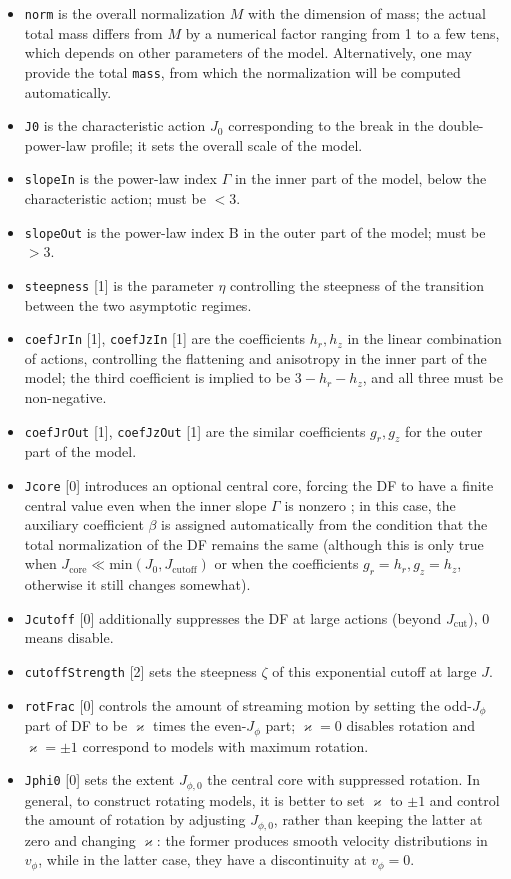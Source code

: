 \documentclass[12pt]{article}
\newcommand{\ppp}[1]{\textcolor{darkolive} {\texttt{#1}}}
\newcommand{\Beta}{\mathrm B}
\begin{document}
\begin{itemize}
\item \ppp{norm} is the overall normalization $M$ with the dimension of mass; the actual total mass differs from $M$ by a numerical factor ranging from 1 to a few tens, which depends on other parameters of the model. Alternatively, one may provide the total \ppp{mass}, from which the normalization will be computed automatically.
\item \ppp{J0} is the characteristic action $J_0$ corresponding to the break in the double-power-law profile; it sets the overall scale of the model.
\item \ppp{slopeIn} is the power-law index $\Gamma$ in the inner part of the model, below the characteristic action; must be $<3$.
\item \ppp{slopeOut} is the power-law index $\Beta$ in the outer part of the model; must be $>3$.
\item \ppp{steepness} [1] is the parameter $\eta$ controlling the steepness of the transition between the two asymptotic regimes.
\item \ppp{coefJrIn} [1], \ppp{coefJzIn} [1] are the coefficients $h_r, h_z$ in the linear combination of actions, controlling the flattening and anisotropy in the inner part of the model; the third coefficient is implied to be $3-h_r-h_z$, and all three must be non-negative.
\item \ppp{coefJrOut} [1], \ppp{coefJzOut} [1] are the similar coefficients $g_r, g_z$ for the outer part of the model.
\item \ppp{Jcore} [0] introduces an optional central core, forcing the DF to have a finite central value even when the inner slope $\Gamma$ is nonzero \cite{ColeBinney2017}; in this case, the auxiliary coefficient $\beta$ is assigned automatically from the condition that the total normalization of the DF remains the same (although this is only true when $J_\mathrm{core}\ll \mathrm{min}(J_0, J_\mathrm{cutoff})$ or when the coefficients $g_r=h_r, g_z=h_z$, otherwise it still changes somewhat).
\item \ppp{Jcutoff} [0] additionally suppresses the DF at large actions (beyond $J_\mathrm{cut}$), 0  means disable.
\item \ppp{cutoffStrength} [2] sets the steepness $\zeta$ of this exponential cutoff at large $J$.
\item \ppp{rotFrac} [0] controls the amount of streaming motion by setting the odd-$J_\phi$ part of DF to be $\varkappa$ times the even-$J_\phi$ part; $\varkappa=0$ disables rotation and $\varkappa=\pm 1$ correspond to models with maximum rotation.
\item \ppp{Jphi0} [0] sets the extent $J_{\phi,0}$ the central core with suppressed rotation. In general, to construct rotating models, it is better to set $\varkappa$ to $\pm 1$ and control the amount of rotation by adjusting $J_{\phi,0}$, rather than keeping the latter at zero and changing $\varkappa$: the former produces smooth velocity distributions in $v_\phi$, while in the latter case, they have a discontinuity at $v_\phi=0$.
\end{itemize}
\end{document}
